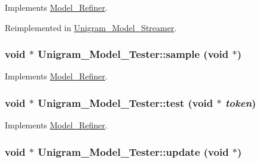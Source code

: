 Implements \hyperlink{class_model___refiner_ae6b2ecaaddf8aa0876cfb42bff713607}{Model\_\-Refiner}.



Reimplemented in \hyperlink{class_unigram___model___streamer_a8a092c8036f7eb09b76b200fb5524ea0}{Unigram\_\-Model\_\-Streamer}.

\hypertarget{class_unigram___model___tester_a81e1571fb84f36e059d8e68e01ab91f1}{
\subsubsection[{sample}]{\setlength{\rightskip}{0pt plus 5cm}void $\ast$ Unigram\_\-Model\_\-Tester::sample (void $\ast$)}}
\label{class_unigram___model___tester_a81e1571fb84f36e059d8e68e01ab91f1}


Implements \hyperlink{class_model___refiner_a6c2ecd4d1df247352c8319e0eb17e1e2}{Model\_\-Refiner}.

\hypertarget{class_unigram___model___tester_ab006fec2130a391827c117a126b00d09}{
\subsubsection[{test}]{\setlength{\rightskip}{0pt plus 5cm}void $\ast$ Unigram\_\-Model\_\-Tester::test (void $\ast$ {\em token})}}
\label{class_unigram___model___tester_ab006fec2130a391827c117a126b00d09}


Implements \hyperlink{class_model___refiner_a5aeef4eee7a0d4f1878356d891ded76d}{Model\_\-Refiner}.

\hypertarget{class_unigram___model___tester_a067e8f0f15ce9c48eef77d22978eaceb}{
\subsubsection[{update}]{\setlength{\rightskip}{0pt plus 5cm}void $\ast$ Unigram\_\-Model\_\-Tester::update (void $\ast$)}}
\label{class_unigram___model___tester_a067e8f0f15ce9c48eef77d22978eaceb}



